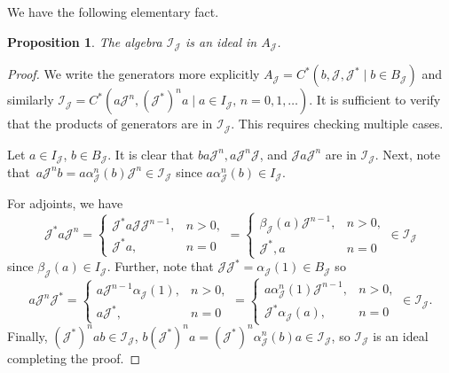 \documentclass[10pt,a4paper]{amsart}
\newcommand{\jcal}{{\mathcal J}}
\newcommand{\fancyJ}{\mathcal{J}}
\numberwithin{equation}{section}
\newtheorem{Proposition}[Theorem]{Proposition}
 { \theoremstyle{definition}
\newtheorem{Definition}[Theorem]{Definition}
\newtheorem{Note}[Theorem]{Note}
\newtheorem{Example}[Theorem]{Example}
\newtheorem{Remark}[Theorem]{Remark} }
\begin{document}
We have the following elementary fact.
\begin{Proposition}
The algebra $\mathcal{I}_\jcal$ is an ideal in $A_\jcal$.
\end{Proposition}
\begin{proof}
We write the generators more explicitly $A_\jcal = C^*(b,\jcal, \jcal^*\mid b\in B_\jcal)$ and similarly $\mathcal{I}_\jcal = C^*(a\jcal^n, (\jcal^*)^n a\mid a\in I_\jcal,\, n=0,1,\dots)$. It is sufficient to verify that the products of generators are in $\mathcal{I}_\jcal$. This requires checking multiple cases.

Let $a\in I_\jcal$, $b\in B_\jcal$. It is clear that $ba\jcal^n, a\jcal^n \jcal$, and $\jcal a\jcal^n$ are in $\mathcal{I}_\jcal$.
Next, note that~${a \jcal^n b = a \alpha_\jcal^n(b)\jcal^n\in \mathcal{I}_\jcal}$ since $a\alpha_\jcal^n(b)\in I_\jcal$.

For adjoints, we have
\begin{equation*}
\jcal^* a \jcal^n = \begin{cases}
\jcal^* a \jcal \jcal^{n-1}, & n>0, \\ \jcal^* a, & n=0
\end{cases}
= \begin{cases}
\beta_\jcal(a)\jcal^{n-1}, & n>0, \\ \jcal^*, a & n=0
\end{cases} \in \mathcal{I}_\jcal
\end{equation*}
since $\beta_\fancyJ(a)\in I_\fancyJ$. Further, note that $\jcal \jcal^* = \alpha_\jcal(1) \in B_\jcal$ so
\begin{equation*}
a\jcal^n \jcal^* = \begin{cases}
a \jcal^{n-1}\alpha_\jcal(1), & n>0, \\ a\jcal^*, & n=0
\end{cases} = \begin{cases}
a\alpha_\jcal^n(1)\jcal^{n-1}, & n>0, \\ \jcal^* \alpha_\jcal(a), & n=0
\end{cases} \in \mathcal{I}_\jcal.
\end{equation*}
Finally, $(\jcal^*)^n ab\in \mathcal{I}_\jcal$, $b(\jcal^*)^na = (\jcal^*)^n\alpha_\jcal^n(b)a \in \mathcal{I}_\jcal$,
so $\mathcal{I}_\jcal$ is an ideal completing the proof.
\end{proof}
\end{document}
